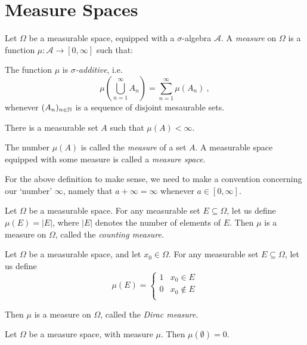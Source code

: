 %
\section{Measure Spaces}\label{sec:measure-spaces}

\begin{definition}
Let $\Omega$ be a measurable space, equipped with a $\sigma$-algebra $\mathscr A$.  
A \emph{measure} on $\Omega$ is a function $\mu \colon {\mathscr A}\rightarrow [0,\infty ]$ such that:
\begin{axiomlist}[M]
\item The function $\mu$ is \emph{$\sigma$-additive}, i.e.
\[  \mu \left( \bigcup_{n=1}^\infty A_n \right) = \sum_{n=1}^\infty \mu (A_n ) \ , \] 
whenever $(A_n)_{n\in \mathbb{N}}$ is a sequence of disjoint mesaurable sets.  
\item There is a measurable set $A$ such that $\mu (A)<\infty$.
\end{axiomlist}
The number $\mu (A)$ is called the \emph{measure} of a set $A$.  A measurable space equipped with some measure is called a 
\emph{measure space}.
\end{definition}

For the above definition to make sense, we need to make a convention concerning our `number' $\infty$, namely that $a + \infty = \infty$ whenever $a\in [0,\infty ]$.  

\begin{example}
Let $\Omega$ be a measurable space.  For any measurable set $E\subseteq \Omega$, let us define
$\mu (E) = |E|$, where $|E|$ denotes the number of elements of $E$.  Then $\mu$ is a measure on $\Omega$, called the {\em counting measure}.
\end{example}

\begin{example}
Let $\Omega$ be a measurable space, and let $x_0 \in \Omega$.  For any measurable set $E\subseteq \Omega$, let us define
$$\mu (E) = \left\{ \begin{array}{ll}
1 & x_0 \in E \\
0 & x_0 \not\in E \\
\end{array} \right.$$

Then $\mu$ is a measure on $\Omega$, called the {\em Dirac measure}.
\end{example}

\begin{proposition}
Let $\Omega$ be a measure space, with measure $\mu$.  Then $\mu (\emptyset ) =0$.
\end{proposition}

